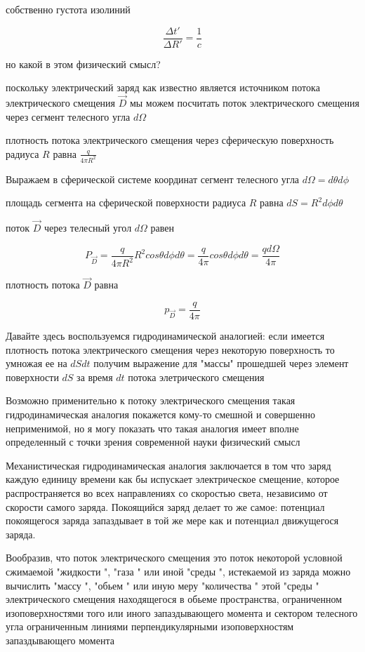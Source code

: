 \documentclass{article}
\begin{document}
собственно густота изолиний

$$\frac{\Delta t'}{\Delta R'} = \frac{1}{c}$$

но какой в этом физический смысл?

поскольку электрический заряд как известно является источником потока электрического смещения $\vec D$ мы можем посчитать поток электрического смещения через сегмент телесного угла $d \Omega$

плотность потока электрического смещения через сферическую поверхность радиуса $R$ равна $\frac{q}{4\pi R^2}$

Выражаем в сферической системе координат сегмент телесного угла $d \Omega = d \theta  d \phi$

площадь сегмента на сферической поверхности радиуса $R$ равна $d S = R^2 d \phi d \theta$

поток  $\vec D$ через телесный угол $d \Omega$ равен

$$P_{\vec D} = \frac{q}{4\pi R^2} R^2 cos \theta d \phi d \theta = \frac{q}{4\pi} cos \theta d \phi d\theta= \frac{q d\Omega}{4 \pi}$$

плотность потока $\vec D$ равна

$$p_{\vec D} = \frac{q}{4\pi}$$

Давайте здесь воспользуемся гидродинамической аналогией: если имеется плотность потока электрического смещения через некоторую поверхность то умножая ее на $dS dt$  получим выражение для "массы" прошедшей через элемент поверхности $dS$ за время $dt$ потока элетрического смещения

Возможно применительно к потоку электрического смещения такая гидродинамическая аналогия покажется кому-то смешной и совершенно неприменимой, но я могу показать что такая аналогия имеет вполне определенный с точки зрения современной науки физический смысл

Механистическая гидродинамическая аналогия заключается в том что заряд каждую единицу времени как бы испускает электрическое смещение, которое распространяется во всех направлениях со скоростью света, независимо от скорости самого заряда. Покоящийся заряд делает то же самое: потенциал покоящегося заряда запаздывает в той же мере как и потенциал движущегося заряда.

Вообразив, что поток электрического смещения это поток некоторой условной сжимаемой "жидкости ", "газа " или иной "среды ", истекаемой из заряда можно вычислить "массу ", "обьем " или иную меру "количества " этой "среды " электрического смещения находящегося в обьеме пространства, ограниченном изоповерхностями того или иного запаздывающего момента и сектором телесного угла ограниченным линиями перпендикулярными изоповерхностям запаздывающего момента
\end{document}

